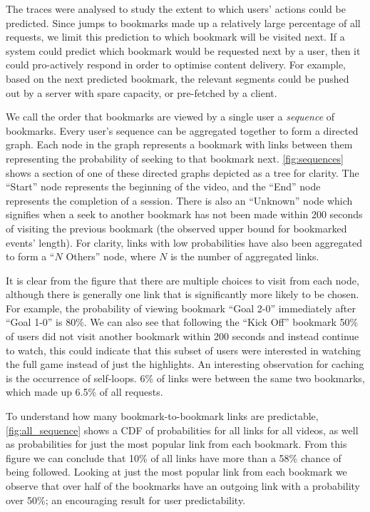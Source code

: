 The traces were analysed to study the extent to which users' actions could be predicted. Since jumps to bookmarks made up a relatively large percentage of all requests, we limit this prediction to which bookmark will be visited next.
If a system could predict which bookmark would be requested next by a user, then it could pro-actively respond in order to optimise content delivery. For example, based on the next predicted bookmark, the relevant segments could be pushed out by a server with spare capacity, or pre-fetched by a client.

We call the order that bookmarks are viewed by a single user a {\em sequence} of bookmarks. Every user's sequence can be aggregated together to form a directed graph. Each node in the graph represents a bookmark with links between them representing the probability of seeking to that bookmark next. \autoref{fig:sequences} shows a section of one of these directed graphs depicted as a tree for clarity. The ``Start'' node represents the beginning of the video, and the ``End'' node represents the completion of a session. There is also an ``Unknown'' node which signifies when a seek to another bookmark has not been made within 200 seconds of visiting the previous bookmark (the observed upper bound for bookmarked events' length). For clarity, links with low probabilities have also been aggregated to form a ``$N$ Others'' node, where $N$ is the number of aggregated links.

It is clear from the figure that there are multiple choices to visit from each node, although there is generally one link that is significantly more likely to be chosen. For example, the probability of viewing bookmark ``Goal 2-0'' immediately after ``Goal 1-0'' is 80\%. We can also see that following the ``Kick Off'' bookmark 50\% of users did not visit another bookmark within 200 seconds and instead continue to watch, this could indicate that this subset of users were interested in watching the full game instead of just the highlights. An interesting observation for caching is the occurrence of self-loops. 6\% of links were between the same two bookmarks, which made up 6.5\% of all requests.

To understand how many bookmark-to-bookmark links are predictable, \autoref{fig:all_sequence} shows a CDF of probabilities for all links for all videos, as well as probabilities for just the most popular link from each bookmark. From this figure we can conclude that 10\% of all links have more than a 58\% chance of being followed.
Looking at just the most popular link from each bookmark we observe that over half of the bookmarks have an outgoing link with a probability over 50\%; an encouraging result for user predictability.

